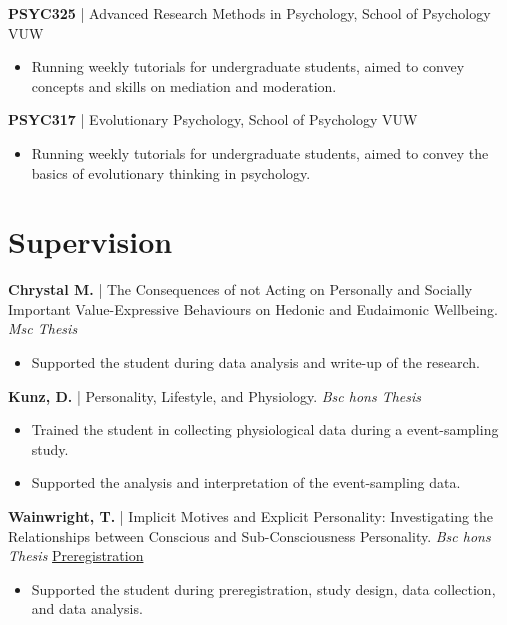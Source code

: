 \documentclass[11pt]{article} %
\begin{document}
\textbf{PSYC325} | Advanced Research Methods in Psychology, School of Psychology VUW
\begin{itemize}
\item Running weekly tutorials for undergraduate students, aimed to convey concepts and skills on mediation and moderation.
\end{itemize}


\textbf{PSYC317} | Evolutionary Psychology, School of Psychology VUW
\begin{itemize}
\item Running weekly tutorials for undergraduate students, aimed to convey the basics of evolutionary thinking in psychology.
\end{itemize}

\section*{Supervision}

\textbf{Chrystal M.} | The Consequences of not Acting on Personally and Socially Important Value-Expressive Behaviours on Hedonic and Eudaimonic Wellbeing. \emph{Msc Thesis}
\begin{itemize}
\item Supported the student during data analysis and write-up of the research.
\end{itemize}



\textbf{Kunz, D.} | Personality, Lifestyle, and Physiology. \emph{Bsc hons Thesis}
\begin{itemize}
\item Trained the student in collecting physiological data during a event-sampling study.
\item Supported the analysis and interpretation of the event-sampling data.
\end{itemize}

\textbf{Wainwright, T.} | Implicit Motives and Explicit Personality: Investigating the Relationships between Conscious and
Sub-Consciousness Personality. \emph{Bsc hons Thesis} \href{https://osf.io/zcsw9/?view_only=b92b80efe48a4cacabdeca94dfc07779}{Preregistration}

\begin{itemize}
\item Supported the student during preregistration, study design, data collection, and data analysis. 
\end{itemize}
\end{document}

